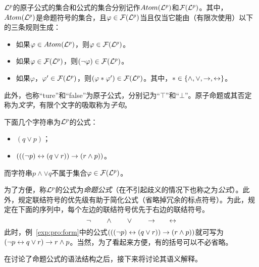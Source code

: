 ${\cal L}^p$的原子公式的集合和公式的集合分别记作$Atom({\cal L}^p)$和${\cal F}({\cal L}^p)$。其中，$Atom({\cal L}^p)$是命题符号的集合，且$\varphi\in {\cal F}({\cal L}^p)$当且仅当它能由（有限次使用）以下的三条规则生成\cite{luzhongwan1989}：
\begin{itemize}
	\item 如果$\varphi\in Atom({\cal L}^p)$，则$\varphi \in {\cal F}({\cal L}^p)$。
	\item 如果$\varphi \in {\cal F}({\cal L}^p)$，则$(\neg \varphi)\in {\cal F}({\cal L}^p)$。
	\item 如果$\varphi$，$\varphi'\in {\cal F}({\cal L}^p)$，则$(\varphi * \varphi')\in {\cal F}({\cal L}^p)$。其中，$*\in \{\wedge,\vee, \rightarrow, \leftrightarrow\}$。
\end{itemize}
此外，也称“ture”和“false”为原子公式，分别记为“$\top$”和“$\bot$”。原子命题或其否定称为\emph{文字}，有限个文字的吸取称为\emph{子句}。

\begin{example}\label{exp:pro:form}
	下面几个字符串为${\cal L}^p$的公式：
	\begin{itemize}
		\item $(q \vee p)$；
		\item $(((\neg p)\leftrightarrow(q\vee r))\rightarrow(r \wedge p))$。
	\end{itemize}
	而字符串$p\wedge \vee q$不属于集合$\varphi\in {\cal F}({\cal L}^p)$。
\end{example}


为了方便，称${\cal L}^p$的公式为\emph{命题公式}（在不引起歧义的情况下也称之为\emph{公式}）。此外，规定联结符号的优先级有助于简化公式（省略掉冗余的标点符号）。为此，规定在下面的序列中，每个左边的联结符号优先于右边的联结符号。
\[
\neg \qquad \wedge \qquad \vee \qquad \rightarrow \qquad \leftrightarrow
\]
此时，例~\ref{exp:pro:form}中的公式$(((\neg p)\leftrightarrow(q\vee r))\rightarrow(r \wedge p))$就可写为$(\neg p \leftrightarrow q \vee r) \rightarrow r \wedge p$。当然，为了看起来方便，有的括号可以不必省略。

在讨论了命题公式的语法结构之后，接下来将讨论其语义解释。

